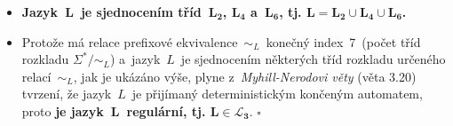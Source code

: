 \documentclass[a4paper, 11pt]{scrartcl}
\newcommand*{\QEDB}{\hfill\ensuremath{\square}}
\begin{document}
\begin{itemize}
        \item
            \textbf{Jazyk~$ \mathbf{L} $~je sjednocením tříd~$
            \mathbf{L_2} $, $ \mathbf{L_4} $ a~$ \mathbf{L_6} $,
            tj. $ \mathbf{L = L_2 \cup L_4 \cup L_6} $.}

        \item
            Protože má relace prefixové ekvivalence~$ \sim_L $~konečný
            index~7~(počet tříd rozkladu $ \Sigma^* / \sim_L $)
            a~jazyk~$ L $~je sjednocením některých tříd rozkladu
            určeného relací~$ \sim_L $, jak je ukázáno výše, plyne
            z~\emph{Myhill-Nerodovi věty} (věta 3.20)
            tvrzení, že jazyk~$ L $~je přijímaný deterministickým
            končeným automatem, proto \textbf{je jazyk~$ \mathbf{L}
            $~regulární, tj. $ \mathbf{L \in \mathcal{L}_3} $}. \QEDB
    \end{itemize}
\end{document}
